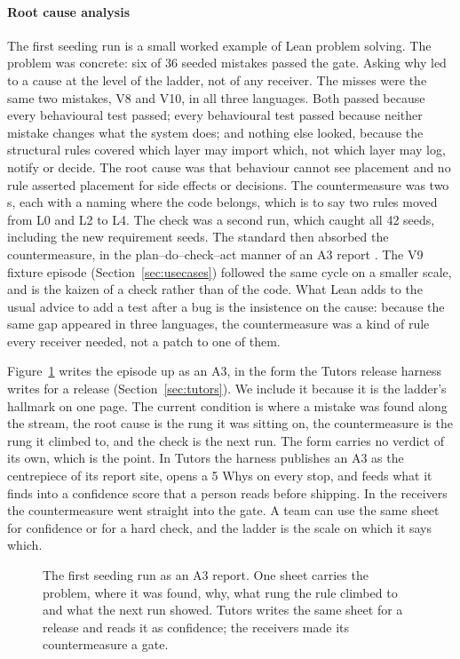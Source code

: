\paragraph{Root cause analysis} The first seeding run is a small worked example of Lean problem
solving. The problem was concrete: six of 36 seeded mistakes passed the gate. Asking why led to a
cause at the level of the ladder, not of any receiver. The misses were the same two mistakes, V8
and V10, in all three languages. Both passed because every behavioural test passed; every
behavioural test passed because neither mistake changes what the system does; and nothing else
looked, because the structural rules covered which layer may import which, not which layer may
log, notify or decide. The root cause was that behaviour cannot see placement and no rule asserted
placement for side effects or decisions. The countermeasure was two s,
each with a  naming where the code belongs, which is to say two rules
moved from L0 and L2 to L4. The check was a second run, which caught all 42 seeds, including the new requirement
seeds. The standard then
absorbed the countermeasure, in the plan--do--check--act manner of an A3 report
\citep{sobek2008a3}. The V9 fixture episode (Section~\ref{sec:usecases}) followed the same cycle on
a smaller scale, and is the kaizen of a check rather than of the code. What Lean adds to the usual
advice to add a test after a bug is the insistence on the cause: because the same gap appeared in
three languages, the countermeasure was a kind of rule every receiver needed, not a patch to one of
them.

Figure~\ref{fig:a3} writes the episode up as an A3, in the form the Tutors release harness
writes for a release (Section~\ref{sec:tutors}). We include it because it is the ladder's
hallmark on one page. The current condition is where a mistake was found along the stream, the
root cause is the rung it was sitting on, the countermeasure is the rung it climbed to, and the
check is the next run. The form carries no verdict of its own, which is the point. In Tutors the
harness publishes an A3 as the centrepiece of its report site, opens a 5 Whys on every stop, and
feeds what it finds into a confidence score that a person reads before shipping. In the receivers the countermeasure went straight into the gate.
A team can use the same sheet for confidence or for a hard check, and the ladder is the scale
on which it says which.

\begin{figure}[t]
  \centering
  \resizebox{0.96\linewidth}{!}{}
  \caption{The first seeding run as an A3 report. One sheet carries the problem, where it was
  found, why, what rung the rule climbed to and what the next run showed. Tutors writes the same
  sheet for a release and reads it as confidence; the receivers made its countermeasure a gate.}
  \label{fig:a3}
\end{figure}

